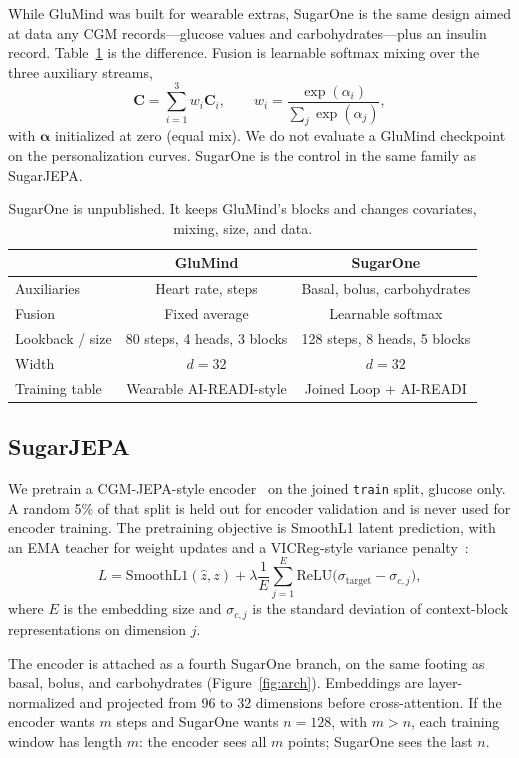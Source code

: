 \documentclass[11pt,a4paper]{article}
\begin{document}
While GluMind was built for wearable extras, SugarOne is the same design
aimed at data any CGM records---glucose values and carbohydrates---plus an
insulin record. Table~\ref{tab:glumind-vs-sugarone} is the difference.
Fusion is learnable softmax mixing over the three auxiliary streams,
\[
\mathbf{C}=\sum_{i=1}^{3}w_i\mathbf{C}_i,\qquad
w_i=\frac{\exp(\alpha_i)}{\sum_{j}\exp(\alpha_j)},
\]
with \(\boldsymbol{\alpha}\) initialized at zero (equal mix). We do not evaluate a
GluMind checkpoint on the personalization curves. SugarOne is the control in
the same family as SugarJEPA.

\begin{table}[t]
\centering
\small
\begin{tabular}{lcc}
\toprule
 & GluMind & SugarOne \\
\midrule
Auxiliaries & Heart rate, steps & Basal, bolus, carbohydrates \\
Fusion & Fixed average & Learnable softmax \\
Lookback / size & 80 steps, 4 heads, 3 blocks & 128 steps, 8 heads, 5 blocks \\
Width & \(d=32\) & \(d=32\) \\
Training table & Wearable AI-READI-style & Joined Loop + AI-READI \\
\bottomrule
\end{tabular}
\caption{SugarOne is unpublished. It keeps GluMind's blocks and changes
covariates, mixing, size, and data.}
\label{tab:glumind-vs-sugarone}
\end{table}

\subsection{SugarJEPA}
\label{sec:sugarjepa}

We pretrain a CGM-JEPA-style encoder~\citep{muhammad2026cgmjepa} on the
joined \texttt{train} split, glucose only. A random 5\% of that split is held
out for encoder validation and is never used for encoder training. The
pretraining objective is SmoothL1 latent prediction, with an EMA teacher for
weight updates and a VICReg-style variance
penalty~\citep{bardes2022vicreg}:
\[
L=\mathrm{SmoothL1}(\hat{z},z)
+\lambda\frac{1}{E}\sum_{j=1}^{E}
\mathrm{ReLU}\bigl(\sigma_{\mathrm{target}}-\sigma_{c,j}\bigr),
\]
where \(E\) is the embedding size and \(\sigma_{c,j}\) is the standard
deviation of context-block representations on dimension \(j\).

The encoder is attached as a fourth SugarOne branch, on the same footing as
basal, bolus, and carbohydrates (Figure~\ref{fig:arch}). Embeddings are
layer-normalized and projected from 96 to 32 dimensions before
cross-attention. If the encoder wants \(m\) steps and SugarOne wants
\(n=128\), with \(m>n\), each training window has length \(m\): the encoder
sees all \(m\) points; SugarOne sees the last \(n\).
\end{document}
